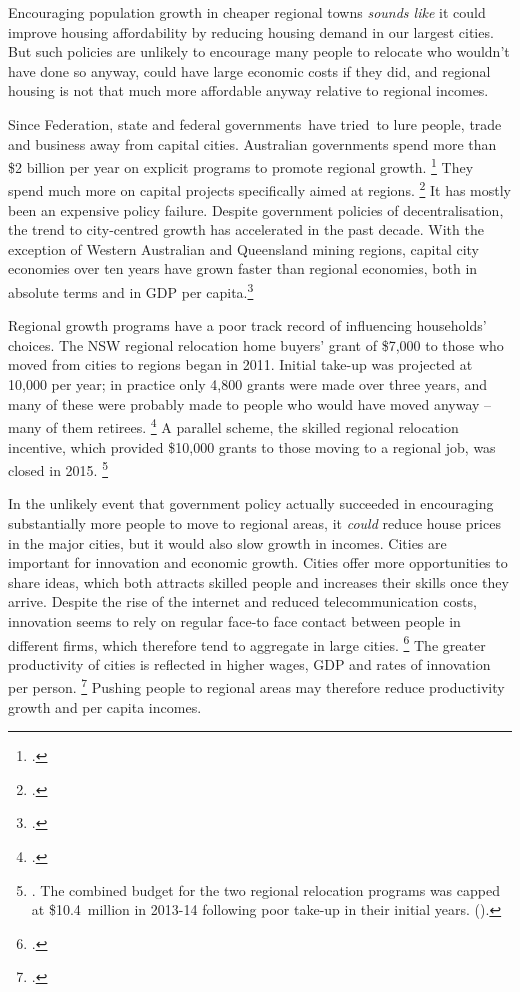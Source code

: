 Encouraging population growth in cheaper regional towns \emph{sounds like} it could improve housing affordability by reducing housing demand in our largest cities.
But such policies are unlikely to encourage many people to relocate who wouldn't have done so anyway, could have large economic costs if they did, and regional housing is not that much more affordable anyway relative to regional incomes.

Since Federation, state and federal governments~have tried~to lure people, trade and business away from capital cities.
Australian governments spend more than \$2 billion per year on explicit programs to promote regional growth.%
	\footcites{DaleyCoates-2017-theAge-Stamp-duty-wont-help-housing-affordability}{DaleyLancy2011-Investing-regions}{Terrill-2017-theOz-Bush-may-not-like-it}
They spend much more on capital projects specifically aimed at regions.%
    \footcite[][65--68]{PC-2017-Transitioning-regions}
It has mostly been an expensive policy failure.
Despite government policies of decentralisation, the trend to city-centred growth has accelerated in the past decade.
With the exception of Western Australian and Queensland mining regions, capital city economies over ten years have grown faster than regional economies, both in absolute terms and in GDP per capita.\footcite[][5]{SGS2016_Aus_cities_201516}

Regional growth programs have a poor track record of influencing households' choices.
The NSW regional relocation home buyers' grant of \$7,000 to those who moved from cities to regions began in 2011.
Initial take-up was projected at 10,000 per year; in practice only 4,800 grants were made over three years, and many of these were probably made to people who would have moved anyway -- many of them retirees.%
	\footcite{theOz-2017-NSW-regional-home-buyers-scheme-failure}
A parallel scheme, the skilled regional relocation incentive, which provided \$10,000 grants to those moving to a regional job, was closed in 2015.%
	\footnote{\textcite{RevenueNSW-2017-SkilledRegionalReolcationIncentive}.
The combined budget for the two regional relocation programs was capped at \$10.4~million in 2013-14 following poor take-up in their initial years. (\textcite[][140]{NSW-Finance-Services-201314-Annual-report}).}

In the unlikely event that government policy actually succeeded in encouraging substantially more people to move to regional areas, it \emph{could} reduce house prices in the major cities, but it would also slow growth in incomes.
Cities are important for innovation and economic growth.
Cities offer more opportunities to share ideas, which both attracts skilled people and increases their skills once they arrive.
Despite the rise of the internet and reduced telecommunication costs, innovation seems to rely on regular face-to face contact between people in different firms, which therefore tend to aggregate in large cities.%
	\footcites{DaleyLancy2011-Investing-regions}{KellyDonegan2015-City-limits}
The greater productivity of cities is reflected in higher wages, GDP and rates of innovation per person.%
	\footcite{Romer-cities}
Pushing people to regional areas may therefore reduce productivity growth and per capita incomes.

